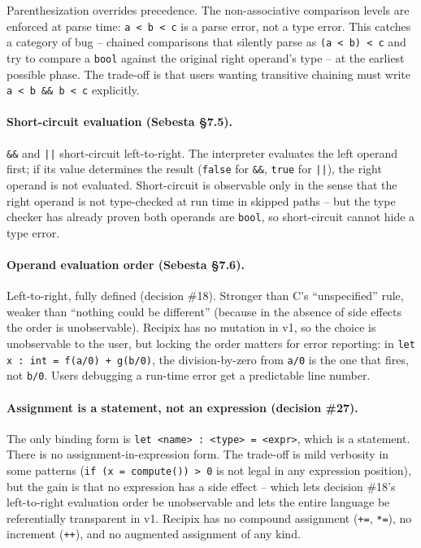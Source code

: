 \documentclass[11pt,a4paper]{article}
\begin{document}
\noindent Parenthesization overrides precedence. The non-associative
comparison levels are enforced at parse time: \texttt{a < b < c} is a
parse error, not a type error. This catches a category of bug -- chained
comparisons that silently parse as \texttt{(a < b) < c} and try to
compare a \texttt{bool} against the original right operand's type -- at
the earliest possible phase. The trade-off is that users wanting
transitive chaining must write \texttt{a < b \&\& b < c} explicitly.

\paragraph{Short-circuit evaluation (Sebesta \S7.5).} \texttt{\&\&}
and \texttt{||} short-circuit left-to-right. The interpreter evaluates
the left operand first; if its value determines the result
(\texttt{false} for \texttt{\&\&}, \texttt{true} for \texttt{||}), the
right operand is not evaluated. Short-circuit is observable only in
the sense that the right operand is not type-checked at run time in
skipped paths -- but the type checker has already proven both operands
are \texttt{bool}, so short-circuit cannot hide a type error.

\paragraph{Operand evaluation order (Sebesta \S7.6).} Left-to-right,
fully defined (decision \#18). Stronger than C's ``unspecified'' rule,
weaker than ``nothing could be different'' (because in the absence of
side effects the order is unobservable). Recipix has no mutation in v1,
so the choice is unobservable to the user, but locking the order
matters for error reporting: in \texttt{let x : int = f(a/0) + g(b/0)},
the division-by-zero from \texttt{a/0} is the one that fires, not
\texttt{b/0}. Users debugging a run-time error get a predictable
line number.

\paragraph{Assignment is a statement, not an expression
(decision \#27).} The only binding form is \texttt{let <name> : <type>
= <expr>}, which is a statement. There is no assignment-in-expression
form. The trade-off is mild verbosity in some patterns (\texttt{if (x =
compute()) > 0} is not legal in any expression position), but the
gain is that no expression has a side effect -- which lets decision
\#18's left-to-right evaluation order be unobservable and lets the
entire language be referentially transparent in v1. Recipix has no
compound assignment (\texttt{+=}, \texttt{*=}), no increment
(\texttt{++}), and no augmented assignment of any kind.
\end{document}
